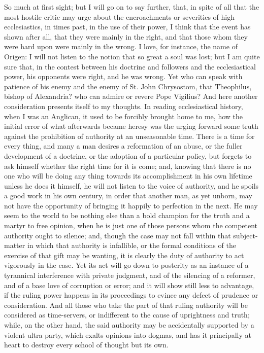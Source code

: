 So much at first sight; but I will go on to say further, that, in
spite of all that the most hostile critic may urge about the
encroachments or severities of high ecclesiastics, in times past, in the
use of their power, I think that the event has shown after all, that
they were mainly in the right, and that those whom they were hard upon were mainly
in the wrong. I love, for instance, the name of
Origen: I will not listen to the notion that so great a soul was lost;
but I am quite sure that, in the contest between his doctrine and
followers and the ecclesiastical power, his opponents were
right, and he was wrong. Yet who can speak with patience of his enemy
and the enemy of St. John Chrysostom, that Theophilus, bishop of
Alexandria? who can admire or revere Pope Vigilius? And here another
consideration presents itself to my thoughts. In reading ecclesiastical
history, when I was an Anglican, it used to be forcibly brought home to
me, how the initial error of what afterwards became heresy was the
urging forward some truth against the prohibition of authority at an
unseasonable time. There is a time for every thing, and many a man
desires a reformation of an abuse, or the fuller development of a
doctrine, or the adoption of a particular policy, but forgets to ask
himself whether the right time for it is come; and, knowing that there
is no one who will be doing any thing towards its
accomplishment in his own lifetime unless he does it himself, he
will not listen to the voice of authority, and he spoils a good
work in his own century, in order that another man, as yet
unborn, may not have the opportunity of bringing it
happily to perfection in the next. He may seem to the world to be
nothing else than a bold champion for the truth and a martyr to free
opinion, when he is just one of those persons whom the competent
authority ought to silence; and, though the case may not fall within
that subject-matter in which that authority is infallible, or the formal
conditions of the exercise of that gift may be wanting, it is clearly
the duty of authority to act vigorously in the case. Yet its act will go down to posterity as an instance of a tyrannical
interference with private judgment, and of the silencing of a reformer,
and of a base love of corruption or error; and it will show still less
to advantage, if the ruling power happens in its proceedings to
evince any defect of prudence or consideration. And all those who
take the part of that ruling authority will be considered as
time-servers, or indifferent to the cause of uprightness and truth;
while, on the other hand, the said authority may be accidentally
supported by a violent ultra party, which exalts opinions into dogmas,
and has it principally at heart to destroy every school of thought but
its own.

